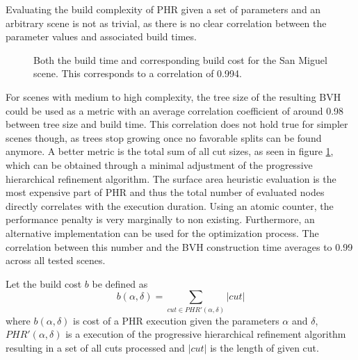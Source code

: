 Evaluating the build complexity of PHR given a set of parameters and an arbitrary scene is not as trivial, as there is no clear correlation between the parameter values and associated build times.  
\begin{figure}
    \centering
    \hfill
    \caption{Both the build time and corresponding build cost for the San Miguel scene. This corresponds to a correlation of 0.994.}
    \label{fig:build_cost}
\end{figure}
For scenes with medium to high complexity, the tree size of the resulting BVH could be used as a metric with an average correlation coefficient of around 0.98 between tree size and build time. This correlation does not hold true for simpler scenes though, as trees stop growing once no favorable splits can be found anymore.
A better metric is the total sum of all cut sizes, as seen in figure \ref{fig:build_cost}, which can be obtained through a minimal adjustment of the progressive hierarchical refinement algorithm. The surface area heuristic evaluation is the most expensive part of PHR and thus the total number of evaluated nodes directly correlates with the execution duration. Using an atomic counter, the performance penalty is very marginally to non existing. Furthermore, an alternative implementation can be used for the optimization process. The correlation between this number and the BVH construction time averages to 0.99 across all tested scenes.

Let the build cost $b$ be defined as
\[
    b(\alpha, \delta) = \sum_{cut\in PHR'(\alpha, \delta)}|cut|
\]
where $b(\alpha, \delta)$ is cost of a PHR execution given the parameters $\alpha$ and $\delta$, $PHR'(\alpha, \delta)$ is a execution of the progressive hierarchical refinement algorithm resulting in a set of all cuts processed and $|cut|$ is the length of given cut.

